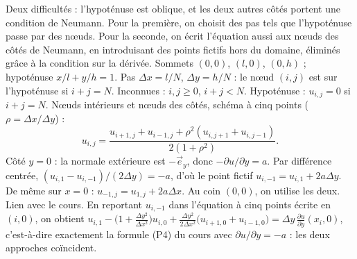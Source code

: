 \Pourquoi Deux difficultés : l'hypoténuse est oblique, et les deux autres côtés
portent une condition de Neumann. Pour la première, on choisit des pas tels que
l'hypoténuse passe par des nœuds. Pour la seconde, on écrit l'équation aussi aux
nœuds des côtés de Neumann, en introduisant des points \og fictifs \fg{} hors
du domaine, éliminés grâce à la condition sur la dérivée.
\Etapes
{} Sommets $(0,0)$, $(l,0)$, $(0,h)$ ; hypoténuse $x/l + y/h = 1$. Pas
$\Delta x = l/N$, $\Delta y = h/N$ : le nœud $(i,j)$ est sur l'hypoténuse si
$i + j = N$. Inconnues : $i, j \ge 0$, $i + j < N$.
 Hypoténuse : $u_{i,j} = 0$ si $i + j = N$.
 Nœuds intérieurs et nœuds des côtés, schéma à cinq points
($\rho = \Delta x/\Delta y$) :
\[
  u_{i,j} = \frac{u_{i+1,j} + u_{i-1,j} + \rho^2(u_{i,j+1} + u_{i,j-1})}{2(1 + \rho^2)} .
\]
 Côté $y = 0$ : la normale extérieure est $-\vec e_y$, donc
$-\partial u/\partial y = a$. Par différence centrée,
$(u_{i,1} - u_{i,-1})/(2\Delta y) = -a$, d'où le point fictif
$u_{i,-1} = u_{i,1} + 2a\Delta y$. De même sur $x = 0$ :
$u_{-1,j} = u_{1,j} + 2a\Delta x$. Au coin $(0,0)$, on utilise les deux.
 Lien avec le cours. En reportant $u_{i,-1}$ dans l'équation à cinq
points écrite en $(i,0)$, on obtient
$u_{i,1} - \bigl(1 + \frac{\Delta y^2}{\Delta x^2}\bigr)u_{i,0}
 + \frac{\Delta y^2}{2\Delta x^2}\bigl(u_{i+1,0} + u_{i-1,0}\bigr) = \Delta y\,\frac{\partial u}{\partial y}(x_i, 0)$,
c'est-à-dire exactement la formule (P4) du cours avec
$\partial u/\partial y = -a$ : les deux approches coïncident.

\begin{center}
\end{center}

